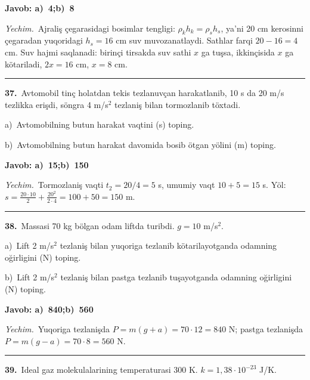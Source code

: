 \documentclass[11pt,a4paper]{article}
\begin{document}
\noindent\colorbox{gray!12}{\parbox{\dimexpr\linewidth-2\fboxsep}{\textbf{Javob: a)\ 4;\quad b)\ 8}}}\par\smallskip
\noindent\textit{Yechim.}\ Ajraliş çegarasidagi bosimlar tengligi: $\rho_k h_k=\rho_s h_s$, ya’ni 20 cm kerosinni çegaradan yuqoridagi $h_s=16$ cm suv muvozanatlaydi. Sathlar farqi $20-16=4$ cm. Suv hajmi saqlanadi: birinçi tirsakda suv sathi $x$ ga tuşsa, ikkinçisida $x$ ga kötariladi, $2x=16$ cm, $x=8$ cm.\par\par\medskip\hrule\medskip
{}\noindent\textbf{37.}\ Avtomobil tinç holatdan tekis tezlanuvçan harakatlanib, 10 s da 20 m/s tezlikka erişdi, söngra 4 m/s$^2$ tezlaniş bilan tormozlanib töxtadi.\par
\noindent\hspace*{4mm}a)\ Avtomobilning butun harakat vaqtini (s) toping.\par
\noindent\hspace*{4mm}b)\ Avtomobilning butun harakat davomida bosib ötgan yölini (m) toping.\par
\noindent\colorbox{gray!12}{\parbox{\dimexpr\linewidth-2\fboxsep}{\textbf{Javob: a)\ 15;\quad b)\ 150}}}\par\smallskip
\noindent\textit{Yechim.}\ Tormozlaniş vaqti $t_2=20/4=5$ s, umumiy vaqt $10+5=15$ s. Yöl: $s=\frac{20\cdot10}{2}+\frac{20^2}{2\cdot4}=100+50=150$ m.\par\par\medskip\hrule\medskip
{}\noindent\textbf{38.}\ Massasi 70 kg bölgan odam liftda turibdi. $g=10$ m/s$^2$.\par
\noindent\hspace*{4mm}a)\ Lift 2 m/s$^2$ tezlaniş bilan yuqoriga tezlanib kötarilayotganda odamning oğirligini (N) toping.\par
\noindent\hspace*{4mm}b)\ Lift 2 m/s$^2$ tezlaniş bilan pastga tezlanib tuşayotganda odamning oğirligini (N) toping.\par
\noindent\colorbox{gray!12}{\parbox{\dimexpr\linewidth-2\fboxsep}{\textbf{Javob: a)\ 840;\quad b)\ 560}}}\par\smallskip
\noindent\textit{Yechim.}\ Yuqoriga tezlanişda $P=m(g+a)=70\cdot12=840$ N; pastga tezlanişda $P=m(g-a)=70\cdot8=560$ N.\par\par\medskip\hrule\medskip
{}\noindent\textbf{39.}\ Ideal gaz molekulalarining temperaturasi 300 K. $k=1{,}38\cdot10^{-23}$ J/K.\par
\end{document}
